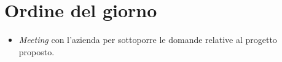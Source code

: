 \section{Ordine del giorno}
\begin{itemize}
  	\item \textit{Meeting} con l'azienda per sottoporre le domande relative al progetto proposto.
\end{itemize}
